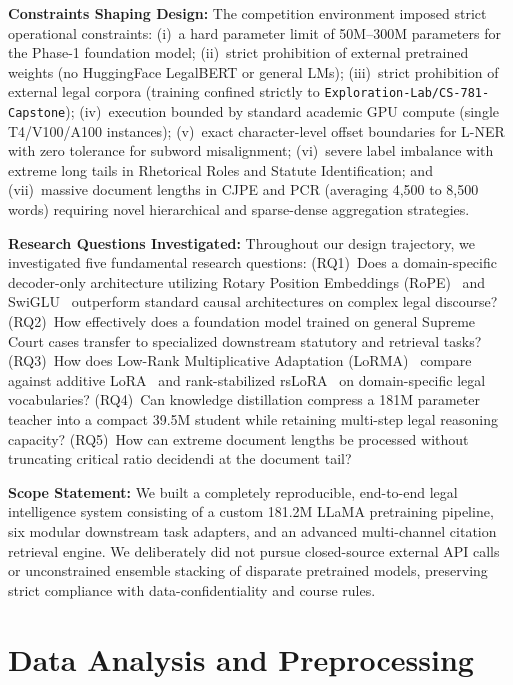 \documentclass[11pt, oneside]{article}
\begin{document}
\noindent
\textbf{Constraints Shaping Design:} The competition environment imposed strict operational constraints: (i)~a hard parameter limit of 50M--300M parameters for the Phase-1 foundation model; (ii)~strict prohibition of external pretrained weights (no HuggingFace LegalBERT or general LMs); (iii)~strict prohibition of external legal corpora (training confined strictly to \texttt{Exploration-Lab/\allowbreak CS-781-Capstone}); (iv)~execution bounded by standard academic GPU compute (single T4/V100/A100 instances); (v)~exact character-level offset boundaries for L-NER with zero tolerance for subword misalignment; (vi)~severe label imbalance with extreme long tails in Rhetorical Roles and Statute Identification; and (vii)~massive document lengths in CJPE and PCR (averaging 4,500 to 8,500 words) requiring novel hierarchical and sparse-dense aggregation strategies.

\noindent
\textbf{Research Questions Investigated:} Throughout our design trajectory, we investigated five fundamental research questions:
(RQ1)~Does a domain-specific decoder-only architecture utilizing Rotary Position Embeddings (RoPE)~\cite{su2024roformer} and SwiGLU~\cite{shazeer2020glu} outperform standard causal architectures on complex legal discourse?
(RQ2)~How effectively does a foundation model trained on general Supreme Court cases transfer to specialized downstream statutory and retrieval tasks?
(RQ3)~How does Low-Rank Multiplicative Adaptation (LoRMA)~\cite{bihany2025lorma} compare against additive LoRA~\cite{hu2022lora} and rank-stabilized rsLoRA~\cite{dam2023rslora} on domain-specific legal vocabularies?
(RQ4)~Can knowledge distillation compress a 181M parameter teacher into a compact 39.5M student while retaining multi-step legal reasoning capacity?
(RQ5)~How can extreme document lengths be processed without truncating critical ratio decidendi at the document tail?

\noindent
\textbf{Scope Statement:} We built a completely reproducible, end-to-end legal intelligence system consisting of a custom 181.2M LLaMA pretraining pipeline, six modular downstream task adapters, and an advanced multi-channel citation retrieval engine. We deliberately did not pursue closed-source external API calls or unconstrained ensemble stacking of disparate pretrained models, preserving strict compliance with data-confidentiality and course rules.

\section{Data Analysis and Preprocessing}
\end{document}
